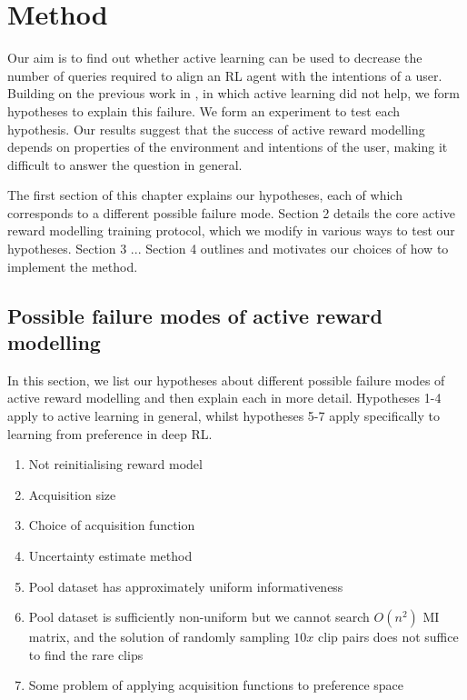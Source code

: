 \documentclass[11pt, a4paper, bibliography=totoc]{report}
\begin{document}
\chapter{Method}
Our aim is to find out whether active learning can be used to decrease the number of queries required to align an RL agent with the intentions of a user. Building on the previous work in \cite{Christiano2017}, in which active learning did not help, we form hypotheses to explain this failure. We form an experiment to test each hypothesis. Our results suggest that the success of active reward modelling depends on properties of the environment and intentions of the user, making it difficult to answer the question in general.

The first section of this chapter explains our hypotheses, each of which corresponds to a different possible failure mode. Section 2 details the core active reward modelling training protocol, which we modify in various ways to test our hypotheses. Section 3 ... Section 4 outlines and motivates our choices of how to implement the method.

\section{Possible failure modes of active reward modelling} \label{sec:failure}
In this section, we list our hypotheses about different possible failure modes of active reward modelling and then explain each in more detail. Hypotheses 1-4 apply to active learning in general, whilst hypotheses 5-7 apply specifically to learning from preference in deep RL. %
\begin{enumerate} %
	\item Not reinitialising reward model
    \item Acquisition size
   	\item Choice of acquisition function
   	\item Uncertainty estimate method
	\item Pool dataset has approximately uniform informativeness
	\item Pool dataset is sufficiently non-uniform but we cannot search $ O(n^2) $ MI matrix, and the solution of randomly sampling $ 10x $ clip pairs does not suffice to find the rare clips
	\item Some problem of applying acquisition functions to preference space
\end{enumerate}
\end{document}

